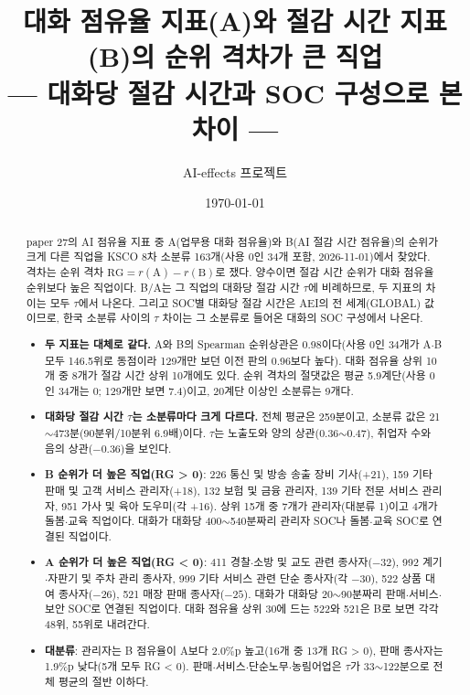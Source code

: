 \documentclass[11pt]{article}
\title{대화 점유율 지표(A)와 절감 시간 지표(B)의 순위 격차가 큰 직업\\[2mm]
\large --- 대화당 절감 시간과 SOC 구성으로 본 차이 ---}
\author{AI-effects 프로젝트}
\date{\today}
\begin{document}
\maketitle

\begin{abstract}
\noindent paper 27의 AI 점유율 지표 중 A(업무용 대화 점유율)와 B(AI 절감 시간 점유율)의 순위가 크게 다른 직업을 KSCO 8차 소분류 163개(사용 0인 34개 포함, 2026-11-01)에서 찾았다. 격차는 순위 격차 $\mathrm{RG} = r(\text{A}) - r(\text{B})$로 쟀다. 양수이면 절감 시간 순위가 대화 점유율 순위보다 높은 직업이다. B/A는 그 직업의 대화당 절감 시간 $\tau$에 비례하므로, 두 지표의 차이는 모두 $\tau$에서 나온다. 그리고 SOC별 대화당 절감 시간은 AEI의 전 세계(GLOBAL) 값이므로, 한국 소분류 사이의 $\tau$ 차이는 그 소분류로 들어온 대화의 SOC 구성에서 나온다.
\begin{itemize}[leftmargin=*]
  \item \textbf{두 지표는 대체로 같다.} A와 B의 Spearman 순위상관은 0.98이다(사용 0인 34개가 A$\cdot$B 모두 146.5위로 동점이라 129개만 보던 이전 판의 0.96보다 높다). 대화 점유율 상위 10개 중 8개가 절감 시간 상위 10개에도 있다. 순위 격차의 절댓값은 평균 5.9계단(사용 0인 34개는 0; 129개만 보면 7.4)이고, 20계단 이상인 소분류는 9개다.
  \item \textbf{대화당 절감 시간 $\tau$는 소분류마다 크게 다르다.} 전체 평균은 259분이고, 소분류 값은 21$\sim$473분(90분위/10분위 6.9배)이다. $\tau$는 노출도와 양의 상관(0.36$\sim$0.47), 취업자 수와 음의 상관($-0.36$)을 보인다.
  \item \textbf{B 순위가 더 높은 직업(RG > 0)}: 226 통신 및 방송 송출 장비 기사(+21), 159 기타 판매 및 고객 서비스 관리자(+18), 132 보험 및 금융 관리자, 139 기타 전문 서비스 관리자, 951 가사 및 육아 도우미(각 +16). 상위 15개 중 7개가 관리자(대분류 1)이고 4개가 돌봄$\cdot$교육 직업이다. 대화가 대화당 400$\sim$540분짜리 관리자 SOC나 돌봄$\cdot$교육 SOC로 연결된 직업이다.
  \item \textbf{A 순위가 더 높은 직업(RG < 0)}: 411 경찰$\cdot$소방 및 교도 관련 종사자($-32$), 992 계기$\cdot$자판기 및 주차 관리 종사자, 999 기타 서비스 관련 단순 종사자(각 $-30$), 522 상품 대여 종사자($-26$), 521 매장 판매 종사자($-25$). 대화가 대화당 20$\sim$90분짜리 판매$\cdot$서비스$\cdot$보안 SOC로 연결된 직업이다. 대화 점유율 상위 30에 드는 522와 521은 B로 보면 각각 48위, 55위로 내려간다.
  \item \textbf{대분류}: 관리자는 B 점유율이 A보다 2.0\%p 높고(16개 중 13개 RG > 0), 판매 종사자는 1.9\%p 낮다(5개 모두 RG < 0). 판매$\cdot$서비스$\cdot$단순노무$\cdot$농림어업은 $\tau$가 33$\sim$122분으로 전체 평균의 절반 이하다.
\end{itemize}
\end{abstract}
\end{document}
